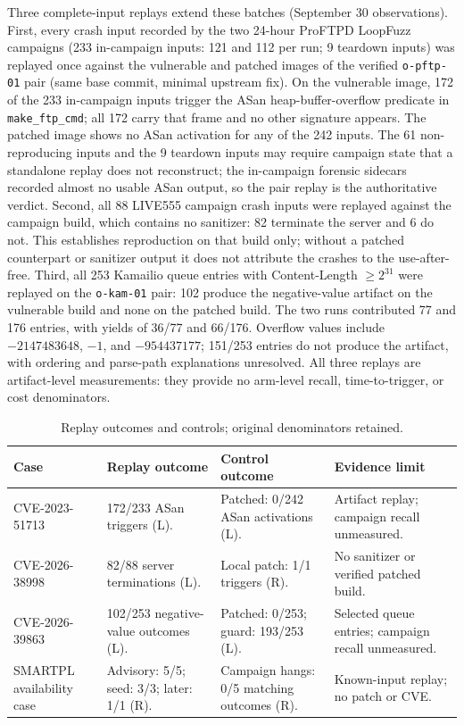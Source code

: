 \documentclass[final,5p,times,number]{elsarticle}
\begin{document}
Three complete-input replays extend these batches (September 30 observations). First, every crash input recorded by the two 24-hour ProFTPD LoopFuzz campaigns (233 in-campaign inputs: 121 and 112 per run; 9 teardown inputs) was replayed once against the vulnerable and patched images of the verified \texttt{o-pftp-01} pair (same base commit, minimal upstream fix). On the vulnerable image, 172 of the 233 in-campaign inputs trigger the ASan heap-buffer-overflow predicate in \texttt{make\_ftp\_cmd}; all 172 carry that frame and no other signature appears. The patched image shows no ASan activation for any of the 242 inputs. The 61 non-reproducing inputs and the 9 teardown inputs may require campaign state that a standalone replay does not reconstruct; the in-campaign forensic sidecars recorded almost no usable ASan output, so the pair replay is the authoritative verdict. Second, all 88 LIVE555 campaign crash inputs were replayed against the campaign build, which contains no sanitizer: 82 terminate the server and 6 do not. This establishes reproduction on that build only; without a patched counterpart or sanitizer output it does not attribute the crashes to the use-after-free. Third, all 253 Kamailio queue entries with Content-Length $\geq 2^{31}$ were replayed on the \texttt{o-kam-01} pair: 102 produce the negative-value artifact on the vulnerable build and none on the patched build. The two runs contributed 77 and 176 entries, with yields of 36/77 and 66/176. Overflow values include $-2147483648$, $-1$, and $-954437177$; 151/253 entries do not produce the artifact, with ordering and parse-path explanations unresolved. All three replays are artifact-level measurements: they provide no arm-level recall, time-to-trigger, or cost denominators.

\begin{table}[!tbp]
\centering\small
\caption{Replay outcomes and controls; original denominators retained.}
\label{tab:cveresults}
\begin{tabularx}{\textwidth}{@{}>{\raggedright\arraybackslash}p{} Y Y Y@{}}
\toprule
Case & Replay outcome & Control outcome & Evidence limit \\
\midrule
\mbox{CVE-2023-51713} & 172/233 ASan triggers (L). & Patched: 0/242 ASan activations (L). & Artifact replay; campaign recall unmeasured. \\
\addlinespace[3pt]
\mbox{CVE-2026-38998} & 82/88 server terminations (L). & Local patch: 1/1 triggers (R). & No sanitizer or verified patched build. \\
\addlinespace[3pt]
\mbox{CVE-2026-39863} & 102/253 negative-value outcomes (L). & Patched: 0/253; guard: 193/253 (L). & Selected queue entries; campaign recall unmeasured. \\
\addlinespace[3pt]
SMARTPL availability case & Advisory: 5/5; seed: 3/3; later: 1/1 (R). & Campaign hangs: 0/5 matching outcomes (R). & Known-input replay; no patch or CVE. \\
\bottomrule
\end{tabularx}
\end{table}
\end{document}
